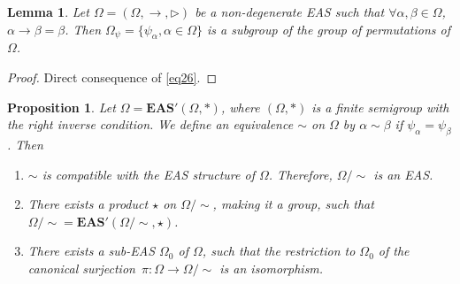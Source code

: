 \documentclass[10pt,a4paper]{amsart}
\numberwithin{equation}{section}
\newtheorem{Lemma}[Theorem]{Lemma}
\newtheorem{Proposition}[Theorem]{Proposition}
 { \theoremstyle{definition}
\newtheorem{Definition}[Theorem]{Definition}
\newtheorem{Note}[Theorem]{Note}
\newtheorem{Example}[Theorem]{Example}
\newtheorem{Remark}[Theorem]{Remark}
\newtheorem{Notation}[Theorem]{Notation}}
\newcommand{\eas}{\mathbf{EAS}}
\begin{document}
\begin{Lemma}\label{lem3.6}
Let $\Omega=(\Omega,\rightarrow,\triangleright)$ be a non-degenerate EAS such that $\forall \alpha,\beta \in \Omega$,
$\alpha \rightarrow\beta=\beta$.
Then $\Omega_\psi=\{\psi_\alpha, \alpha\in \Omega\}$ is a subgroup of the group of permutations of $\Omega$.
\end{Lemma}

\begin{proof} Direct consequence of \eqref{eq26}. \end{proof}

\begin{Proposition}\label{prop3.7}
Let $\Omega=\eas'(\Omega,*)$, where $(\Omega,*)$ is a finite semigroup with the right inverse condition. We define an equivalence $\sim$ on $\Omega$ by $\alpha \sim \beta$ if $\psi_\alpha=\psi_\beta$. Then
\begin{enumerate}\itemsep=0pt
\item[$(1)$] $\sim$ is compatible with the EAS structure of $\Omega$. Therefore, $\Omega/{\sim}$ is an EAS.
\item[$(2)$] There exists a product $\star$ on $\Omega/{\sim}$, making it a group, such that $\Omega/{\sim}=\eas'(\Omega/{\sim},\star)$.
\item[$(3)$] There exists a sub-EAS $\Omega_0$ of $\Omega$, such that the restriction to $\Omega_0$ of the canonical surjection~${\pi\colon\Omega\longrightarrow \Omega/{\sim}}$ is an isomorphism.
\end{enumerate}\end{Proposition}
\end{document}
